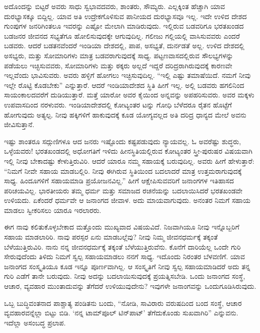 \newpage

ಅದೊಂದನ್ನು ಬಿಟ್ಟರೆ ಅವರು ಸಾಧು ಸ್ವಭಾವದವರು, ಶಾಂತರು, ಸೌಮ್ಯರು. ಎಲ್ಲಕ್ಕಿಂತ ಹೆಚ್ಚಾಗಿ ಯಾವ ದುರಭ್ಯಾಸಕ್ಕೂ ಬಿದ್ದಿಲ್ಲ. ಯಾವ ಅತಿ ಉದ್ರೇಕಗೊಳಿಸುವ ಪಾನೀಯದ ದುರಭ್ಯಾಸವೂ ಇಲ್ಲ. ಇದೇ ಉಳಿದ ದೇಶದ ಗುಂಪುಗಳ ಜನರಿಗಿಂತಲೂ ಇವರನ್ನು ಎಷ್ಟೋ ಮೇಲಾಗಿ ಮಾಡಿರುವುದು. ಇಲ್ಲಿರುವ ಬಡವರಿಗೂ ಭರತಖಂಡದ ಬಡಜನರ ಜೀವನದ ಸಭ್ಯತೆಗೂ ಹೋಲಿಸುವುದಕ್ಕೇ ಆಗುವುದಿಲ್ಲ. ಗಲೀಜು ಗಲ್ಲಿಯಲ್ಲಿ ವಾಸಿಸುವವರು ಎಂದರೆ ಬಡವರು. ಆದರೆ ಬಡತನವೆಂದರೆ ಇಂಡಿಯಾ ದೇಶದಲ್ಲಿ, ಪಾಪ, ಅಸಭ್ಯತೆ, ದುರ್ನಡತೆ ಅಲ್ಲ. ಉಳಿದ ದೇಶದಲ್ಲಿ ಅಸಭ್ಯರು, ಮತ್ತು ಸೋಮಾರಿಗಳು ಮಾತ್ರ ಬಡವರಾಗುವುದಕ್ಕೆ ಸಾಧ್ಯ. ಪಟ್ಟಣವಾಸದಲ್ಲಿರುವ ಸೌಲಭ್ಯಗಳನ್ನು ಪಡೆಯಲು ಇಚ್ಛಿಸುವವರು, ಸೋಮಾರಿಗಳು ಮತ್ತು ಠಕ್ಕರು ಅಲ್ಲದೆ ಇದ್ದರೆ ದರಿದ್ರರಾಗಿರುವುದಕ್ಕೆ ಕಾರಣವೇ ಇಲ್ಲವೆಂದು ಭಾವಿಸುವರು. ಅವರು ಹಳ್ಳಿಗೆ ಹೋಗಲು ಇಚ್ಛಿಸುವುದಿಲ್ಲ. “ಇಲ್ಲಿ ಎಷ್ಟು ತಮಾಷೆಯಿದೆ. ನಮಗೆ ನೀವು ಇಲ್ಲೇ ರೊಟ್ಟಿ ಕೊಡಬೇಕು” ಎನ್ನುತ್ತಾರೆ. ಆದರೆ ಇಂಡಿಯಾದೇಶದ ಸ್ಥಿತಿ ಹೀಗೆ ಇಲ್ಲ. ಅಲ್ಲಿ ಬಡವರು ಹಗಲಿನಿಂದ ಸಾಯಂಕಾಲದವರೆಗೆ ದುಡಿಯುತ್ತಾರೆ. ಮತ್ತೆ ಯಾರೋ ಅವರ ಕೈಯಿಂದ ಅನ್ನವನ್ನು ಅಪಹರಿಸುವರು. ಅವರ ಮಕ್ಕಳು ಉಪವಾಸದಿಂದ ನರಳುವರು. ಇಂಡಿಯಾದೇಶದಲ್ಲಿ ಕೋಟ್ಯಂತರ ಟನ್ನು ಗೋಧಿ ಬೆಳೆದರೂ ರೈತನ ಹೊಟ್ಟೆಗೆ ಹೋಗುವುದು ಅತ್ಯಲ್ಪ. ನೀವು ಹಕ್ಕಿಗಳಿಗೆ ಹಾಕುವುದಕ್ಕೆ ಕೂಡ ಯೋಗ್ಯವಲ್ಲದ ಅತಿ ದರಿದ್ರ ಧಾನ್ಯದ ಮೇಲೆ ಅವನು ಜೀವಿಸುತ್ತಾನೆ.

ಇಷ್ಟು ಶಾಂತರೂ ಸದ್ಗುಣಿಗಳೂ ಆದ ಜನರು ಇಷ್ಟೊಂದು ಕಷ್ಟಪಡುವುದು ನ್ಯಾಯವಲ್ಲ. ಓ ಅವರೆಷ್ಟು ಶುದ್ಧರು, ಒಳ್ಳೆಯವರು! ಭರತಖಂಡದಲ್ಲಿ ಅಧೋಗತಿಗೆ ಇಳಿದು ಹೀನಸ್ಥಿತಿಯಲ್ಲಿರುವ ಕೋಟ್ಯಂತರ ಸ್ತ್ರೀ-ಪುರುಷರ ವಿಷಯವಾಗಿ ಇಲ್ಲಿ ನೀವು ಬೇಕಾದಷ್ಟು ಕೇಳುತ್ತಿರುವಿರಿ. ಆದರೆ ಯಾರೂ ನಮ್ಮ ಸಹಾಯಕ್ಕೆ ಬರುವುದಿಲ್ಲ. ಅವರು ಹೀಗೆ ಹೇಳುತ್ತಾರೆ: “ನಿಮಗೆ ನೀವೇ ಸಹಾಯ ಮಾಡಬಲ್ಲಿರಿ. ನೀವು ಈಗಿರುವ ಸ್ಥಿತಿಯಿಂದ ಬದಲಾದರೆ ಮಾತ್ರ ಉತ್ತಮರಾಗುವುದಕ್ಕೆ ಸಾಧ್ಯ. ಹಿಂದೂಗಳಿಗೆ ಸಹಾಯಮಾಡಿ ಪ್ರಯೋಜನವಿಲ್ಲ.” ಹೀಗೆ ಆಕ್ಷೇಪಿಸುವವರಿಗೆ ಜನಾಂಗಗಳ ಇತಿಹಾಸದ ಪರಿಚಯವಿಲ್ಲ. ಭಾರತೀಯರು ತಮ್ಮ ಧರ್ಮ ಮತ್ತು ಸಮಾಜದ ರಚನೆಯನ್ನು ಬದಲಾಯಿಸಿದರೆ ಭರತಖಂಡವೇ ಉಳಿಯದು. ಏಕೆಂದರೆ ಧರ್ಮವೇ ಆ ಜನಾಂಗದ ಜೀವಾಳ. ಅದು ಮಾಯವಾಗುವುದು. ಅನಂತರ ನಿಮಗೆ ಸಹಾಯ ಮಾಡಲು ಸ್ವೀಕರಿಸಲು ಯಾರೂ ಇರಲಾರರು.

ಈಗ ನಾವು ಕಲಿತುಕೊಳ್ಳಬೇಕಾದ ಮತ್ತೊಂದು ಮುಖ್ಯವಾದ ವಿಷಯವಿದೆ. ನಿಜವಾಗಿಯೂ ನೀವು ಇನ್ನೊಬ್ಬರಿಗೆ ಸಹಾಯ ಮಾಡಲಾರಿರಿ. ನಾವು ಪರಸ್ಪರ ಏನು ಮಾಡಬಲ್ಲೆವು? ನೀವು ನಿಮ್ಮ ಜೀವನಧರ್ಮಕ್ಕೆ ತಕ್ಕಂತೆ ಬೆಳೆಯುತ್ತಿರುವಿರಿ. ನಾನು ನನ್ನ ಜೀವನಧರ್ಮಕ್ಕೆ ತಕ್ಕಂತೆ ಬೆಳೆಯುತ್ತಿರುವೆನು. ಕೊನೆಗೆ ದಾರಿಯೆಲ್ಲ ಒಂದೇ ಗುರಿ ಸೇರುವುದೆಂದು ತಿಳಿದು ನಿಮಗೆ ಸ್ವಲ್ಪ ಸಹಾಯಮಾಡಲು ನನಗೆ ಸಾಧ್ಯ. ಇದೊಂದು ನಿರಂತರ ಬೆಳವಣಿಗೆ. ಯಾವ ಜನಾಂಗದ ಸಂಸ್ಕೃತಿಯೂ ಕೂಡ ಇನ್ನೂ ಪೂರ್ಣವಾಗಿಲ್ಲ. ಆ ಸಂಸ್ಕೃತಿಗೆ ನೀವು ಸ್ವಲ್ಪ ಸಹಾಯಮಾಡಿದರೆ ಅದು ತನ್ನ ಗುರಿ ಎಡೆಗೆ ತಾನೇ ಬರುವುದು. ನೀವು ಅದನ್ನು ಬದಲಾಯಿಸುವುದಕ್ಕೆ ಪ್ರಯತ್ನಿಸಬೇಡಿ. ಒಂದು ಜನಾಂಗದ ಸಂಸ್ಥೆ, ಆಚಾರ, ವ್ಯವಹಾರ ಮುಂತಾದುವನ್ನು ತೆಗೆದರೆ ಉಳಿಯುವುದೇನು? ಇವುಗಳೇ ಜನಾಂಗವನ್ನು ಒಂದುಗೂಡಿಸಿರುವುದು.

ಒಬ್ಬ ಬುದ್ಧಿವಂತನಾದ ಪಾಶ್ಚಾತ್ಯ ಪಂಡಿತನು ಬಂದು, “ನೋಡಿ, ಸಾವಿರಾರು ವರುಷದಿಂದ ಬಂದ ಸಂಸ್ಥೆ, ಆಚಾರ ವ್ಯವಹಾರವನ್ನೆಲ್ಲಾ ಬಿಟ್ಟು ಬಿಡಿ. `ನನ್ನ ಟಾಮ್‌ಪೂಲ್ ಟಿನ್‌ಪಾಟ್' ತೆಗೆದುಕೊಂಡು ಸುಖವಾಗಿರಿ” ಎನ್ನುವನು. ಇದೆಲ್ಲಾ ಅಸಂಬದ್ಧ ಪ್ರಲಾಪ.


